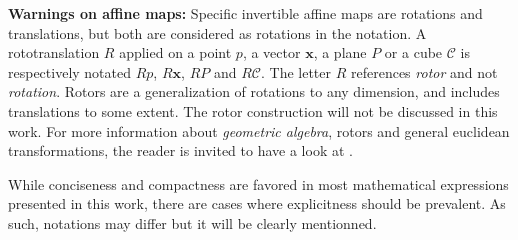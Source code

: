 \textbf{Warnings on affine maps:} Specific invertible affine maps are rotations and translations, but both are considered as rotations in the notation. 
A rototranslation $R$ applied on a point $p$, a vector $\mathbf{x}$, a plane $P$ or a cube $\mathcal{C}$ is 
respectively notated $Rp$, $R\mathbf{x}$, $RP$ and $R\mathcal{C}$. 
The letter $R$ references \textit{rotor} and not \textit{rotation}. Rotors are a generalization of rotations to any dimension, and includes translations to some extent. 
The rotor construction will not be discussed in this work. For more information about \textit{geometric algebra}, rotors and general euclidean transformations, the reader is 
invited to have a look at \cite{dorstGeometricAlgebraComputer2007}.

While conciseness and compactness are favored in most mathematical expressions presented in this work, there are cases where
explicitness should be prevalent. As such, notations may differ but it will be clearly mentionned. 
